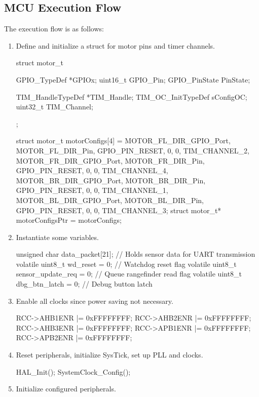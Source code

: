 \subsection{MCU Execution Flow}
The execution flow is as follows:
\begin{enumerate}
	\item Define and initialize a struct for motor pins and timer channels.
	\begin{clisting}[caption={Motor Struct},label={list:motor_struct}]
struct motor_t {
    GPIO_TypeDef *GPIOx;
    uint16_t GPIO_Pin;
    GPIO_PinState PinState;

    TIM_HandleTypeDef *TIM_Handle;
    TIM_OC_InitTypeDef sConfigOC;
    uint32_t TIM_Channel;
};

struct motor_t motorConfigs[4] = { 
    {MOTOR_FL_DIR_GPIO_Port, MOTOR_FL_DIR_Pin, GPIO_PIN_RESET, 0, {0}, TIM_CHANNEL_2}, 
    {MOTOR_FR_DIR_GPIO_Port, MOTOR_FR_DIR_Pin, GPIO_PIN_RESET, 0, {0}, TIM_CHANNEL_4}, 
    {MOTOR_BR_DIR_GPIO_Port, MOTOR_BR_DIR_Pin, GPIO_PIN_RESET, 0, {0}, TIM_CHANNEL_1}, 
    {MOTOR_BL_DIR_GPIO_Port, MOTOR_BL_DIR_Pin, GPIO_PIN_RESET, 0, {0}, TIM_CHANNEL_3}}; 
struct motor_t* motorConfigsPtr = motorConfigs;
	\end{clisting}
	\item Instantiate some variables.
	\begin{clisting}[caption={Communications Variables Initialization},label={list:comms_var_init}]
unsigned char data_packet[21];				// Holds sensor data for UART transmission
volatile uint8_t wd_reset = 0;				// Watchdog reset flag
volatile uint8_t sensor_update_req = 0;		// Queue rangefinder read flag
volatile uint8_t dbg_btn_latch = 0;			// Debug button latch
	\end{clisting}
	\item Enable all clocks since power saving not necessary.
	\begin{clisting}[caption={Enabling Clocks},label={list:enable_clocks}]
RCC->AHB1ENR |= 0xFFFFFFFF;
RCC->AHB2ENR |= 0xFFFFFFFF;
RCC->AHB3ENR |= 0xFFFFFFFF;
RCC->APB1ENR |= 0xFFFFFFFF;
RCC->APB2ENR |= 0xFFFFFFFF;
	\end{clisting}
	\item Reset peripherals, initialize SysTick, set up PLL and clocks.
	\begin{clisting}[caption={HAL and System Clock Initialization},label={list:hal_sysclk_init}]
HAL_Init();
SystemClock_Config();
	\end{clisting}
	\item Initialize configured peripherals.

\end{enumerate}
